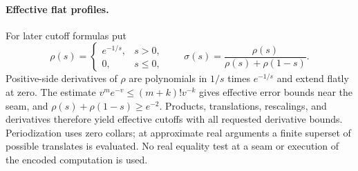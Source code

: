 \paragraph{Effective flat profiles.}
For later cutoff formulas put
\begin{equation}\label{eq:p2-step}
 \rho(s)=\begin{cases}e^{-1/s},&s>0,\\0,&s\le0,\end{cases}
 \qquad \sigma(s)=\frac{\rho(s)}{\rho(s)+\rho(1-s)}.
\end{equation}
Positive-side derivatives of $\rho$ are polynomials in $1/s$ times
$e^{-1/s}$ and extend flatly at zero. The estimate
$v^me^{-v}\le(m+k)!v^{-k}$ gives effective error bounds near the seam,
and $\rho(s)+\rho(1-s)\ge e^{-2}$. Products, translations, rescalings,
and derivatives therefore yield effective cutoffs with all requested
derivative bounds. Periodization uses zero collars; at approximate real
arguments a finite superset of possible translates is evaluated. No real
equality test at a seam or execution of the encoded computation is used.
